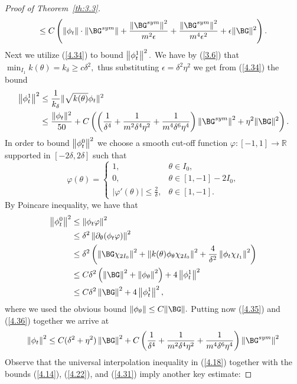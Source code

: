 \begin{proof}[Proof of Theorem~{\ref{th:3.3}}]
\begin{equation}
\leq C\left( \norm{\phi_t}\cdot \norm{\BG^{sym}}+\frac{\norm{\BG^{sym}}^2}{m^2\epsilon}+\frac{\norm{\BG^{sym}}^2}{m^4\epsilon^2}+\epsilon\|\BG\|^2\right).\\
\end{equation}
Next we utilize (\ref{4.34}) to bound $\left\lVert \phi_t^1 \right\rVert^2.$ We have by (\ref{3.6}) that $\min_{I_1} k(\theta)=k_\delta\geq c\delta^2,$ thus substituting $\epsilon=\delta^2 \eta^2$ we get from (\ref{4.34}) the bound 
\begin{align}
\label{4.35}
    \norm{\phi_t^1}^2&\leq \frac{1}{k_\delta}\|\sqrt{k(\theta)}\phi_t\|^2\\ \nonumber
 &\leq \frac{\|\phi_t\|^2}{50}+C\left(\left(\frac{1}{\delta^4}+\frac{1}{m^2\delta^4 \eta^2}+
 \frac{1}{m^4\delta^6\eta^4}\right)\norm{\BG^{sym}}^2+\eta^2\|\BG\|^2\right).   
 \end{align}
In order to bound $\left\lVert \phi_t^0 \right\rVert^2$ we choose a smooth cut-off function $\varphi\colon [-1,1]\to\mathbb R$ supported in $[-2\delta,2\delta]$ such that 
$$
\varphi(\theta)=\begin{cases} 1, &\theta\in I_0,\\
					0, &\theta\in [1,-1]-2I_0, \\
|\varphi'(\theta)|\leq\frac{2}{\delta}, & \theta\in [1,-1].	      
\end{cases}
$$
By Poincare inequality, we have that  
\begin{align}
\label{4.36}
\norm{\phi^0_t}^2 &\leq \norm{\phi_t \varphi}^2\\  \nonumber
&\leq \delta^2 \norm{\partial_\Gth(\phi_t \varphi)}^2\\  \nonumber
&\leq \delta^2\left(\norm{\BG \chi_ {2I_0}}^2+\norm{k(\theta) \phi_\theta \chi_ {2I_0}}^2+\frac{4}{\delta^2}\norm{\phi_t\chi_ {I_1}}^2\right)\\ \nonumber
&\leq C\delta^2\left(\norm{\BG}^2+\norm{\phi_\theta}^2\right)+4\norm{\phi^1_t}^2\\ \nonumber
&\leq C\delta^2 \norm{\BG}^2+4\norm{\phi^1_t}^2,
\end{align}
where we used the obvious bound $\|\phi_\Gth\|\leq C\|\BG\|.$
Putting now (\ref{4.35}) and (\ref{4.36}) together we arrive at 
\begin{equation}
\label{4.37}
\norm{\phi_t}^2\leq C (\delta^2+\eta^2)\norm{\BG}^2+C\left(\frac{1}{\delta^4}+\frac{1}{m^2\delta^4 \eta^2}+
 \frac{1}{m^4\delta^6\eta^4}\right)\norm{\BG^{sym}}^2
\end{equation}
Observe that the universal interpolation inequality in (\ref{4.18}) together with the bounds (\ref{4.14}), (\ref{4.22}), and (\ref{4.31}) imply another key estimate: 

\end{proof}

